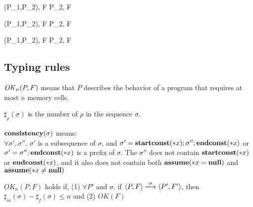 { \langle \Sirx (P_1,P_2), F \rangle \rightarrow \langle P_2, F \rangle }

{ \langle \Sirx (P_1,P_2), F \rangle \rightarrow \langle P_2, F \rangle }

{ \langle \Sirx (P_1,P_2), F \rangle \rightarrow \langle P_2, F \rangle }







\subsection{Typing rules}

\(\mathit{OK}_n(P,F)\) means that \(P\) describes
the behavior of a program that requires at most \(n\) memory cells.

\begin{myDef}[\(\sharp_{\rho}(\sigma)\)]
\label{df:sharf}
\(\sharp_{\rho}(\sigma)\) is the number of \(\rho\) in the sequence
\(\sigma\).
\end{myDef}


\begin{myDef}
\label{df:const}
\(\mathbf{consistency}(\sigma)\) means:\\
\( \forall \sigma',\sigma''\). \(\sigma'\) is a subsequence
of \(\sigma\), and \(\sigma' = \mathbf{startconst}(*x);\sigma'';\mathbf{endconst}(*x)\) or \(\sigma' = \sigma'';\mathbf{endconst}(*x)\) is a prefix of \(\sigma\). The \(\sigma''\) does not contain \(\mathbf{startconst}(*x)\) or \(\mathbf{endconst}(*x) \), and it also does not contain both \(\mathbf{assume}(*x = \mathbf{null})\) and \(\mathbf{assume}(*x \ne \mathbf{null})\) 
\end{myDef}


\begin{myDef}
\label{df:okn}
\(OK_{n}(P, F)\) holds if, (1) \( \forall P'\) and \(\sigma\). if \( \langle P, F \rangle
\xlongrightarrow{\sigma} \langle P', F' \rangle \), then \( \sharp_m(\sigma) - \sharp_f(\sigma) \le n\) and (2) \( OK(F) \)
\end{myDef}

